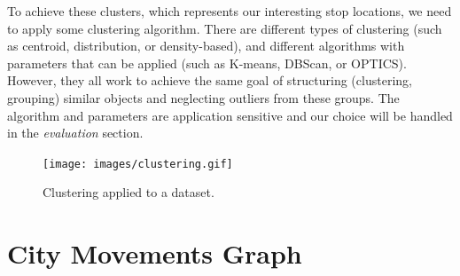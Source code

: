  To achieve these clusters, which represents our interesting stop locations, we need to apply some clustering algorithm. There are different types of clustering (such as centroid, distribution, or density-based), and different algorithms with parameters that can be applied (such as K-means, DBScan, or OPTICS). However, they all work to achieve the same goal of structuring (clustering, grouping) similar objects and neglecting outliers from these groups. The algorithm and parameters are application sensitive and our choice will be handled in the \textit{evaluation} section.

\begin{figure}[!ht]
	\centering
	\texttt{[image: images/clustering.gif]}
	\caption{ Clustering applied to a dataset. }
	\label{fig:clustering}
\end{figure} 



\FloatBarrier
\section{City Movements Graph}

\FloatBarrier